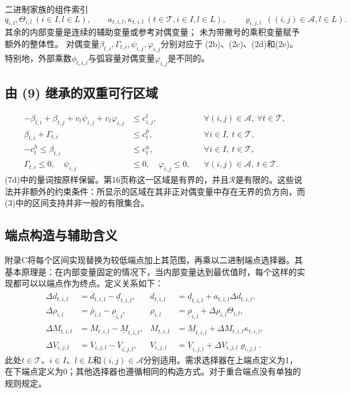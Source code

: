 \documentclass{article}
\begin{document}
二进制家族的组件索引
\[
q_{i,l},\Theta_{i,l}\ (i\in I,l\in L),\qquad
 a_{t,i,l},\kappa_{t,i,l}\ (t\in\mathcal T,i\in I,l\in L),\qquad
\varrho_{i,j,l}\ ((i,j)\in\mathcal A,l\in L).
\]
其余的内部变量是连续的辅助变量或参考对偶变量；
未为带撇号的乘积变量赋予额外的整体性。
对偶变量$\beta_{t,i},\Gamma_{t,i},\psi_{i,j},\varphi_{i,j}$分别对应于
(2b)、(2c)、(2d)和(2e)。特别地，外部乘数$\phi_{t,i,l}$与弧容量对偶变量$\varphi_{i,j}$是不同的。

\subsection*{由 (9) 继承的双重可行区域}
\begin{align}
-\beta_{t,i}+\beta_{t,j}+v_t\psi_{i,j}+v_t\varphi_{i,j}
&\leq c^t_{i,j},
&&\forall(i,j)\in\mathcal A,\ \forall t\in\mathcal T,\tag{7a}\\
\beta_{t,i}+\Gamma_{t,i}&\leq c_t^p,
&&\forall i\in I,\ t\in\mathcal T,\tag{7b}\\
-c_t^h\leq\beta_{t,i}&\leq c_t^u,
&&\forall i\in I,\ t\in\mathcal T,\tag{7c}\\
\Gamma_{t,i}\leq0,\quad\psi_{i,j}&\leq0,\quad\varphi_{i,j}\leq0,
&&\forall(i,j)\in\mathcal A,\ t\in\mathcal T.\tag{7d}
\end{align}
(7d)中的量词按原样保留。第16页称这一区域是有界的，并且$\mathcal R$是有限的。这些说法并非额外的约束条件：所显示的区域在其非正对偶变量中存在无界的负方向，而(3)中的区间支持并非一般的有限集合。

\subsection*{端点构造与辅助含义}
附录C将每个区间实现替换为较低端点加上其范围，再乘以二进制端点选择器。其基本原理是：在内部变量固定的情况下，当内部变量达到最优值时，每个这样的实现都可以以端点作为终点。定义关系如下：
\begin{align*}
\Delta d_{t,i,l}&=\overline d_{t,i,l}-\underline d_{t,i,l},&
d_{t,i,l}&=\underline d_{t,i,l}+a_{t,i,l}\Delta d_{t,i,l},\\
\Delta\rho_{i,l}&=\overline\rho_{i,l}-\underline\rho_{i,l},&
\rho_{i,l}&=\underline\rho_{i,l}+\Delta\rho_{i,l}\Theta_{i,l},\\
\Delta M_{t,i,l}&=\overline M_{t,i,l}-\underline M_{t,i,l},&
M_{t,i,l}&=\underline M_{t,i,l}+\Delta M_{t,i,l}\kappa_{t,i,l},\\
\Delta V_{i,j,l}&=\overline V_{i,j,l}-\underline V_{i,j,l},&
V_{i,j,l}&=\underline V_{i,j,l}+\Delta V_{i,j,l}\varrho_{i,j,l}.
\end{align*}
此处$t\in\mathcal T$、$i\in I$、$l\in L$和$(i,j)\in\mathcal A$分别适用。需求选择器在上端点定义为1，在下端点定义为0；其他选择器也遵循相同的构造方式。对于重合端点没有单独的规则规定。
\end{document}
